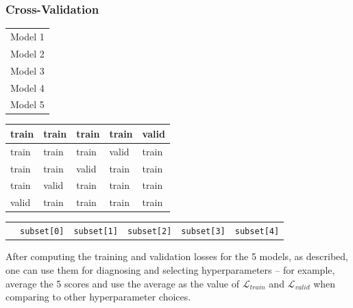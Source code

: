 \documentclass[smaller]{beamer}
\theoremstyle{example}
\newcommand{\ttt}[1]{{\small\texttt{#1}}}
\begin{document}
\begin{frame}[fragile]
    \frametitle{Cross-Validation}
    
\begin{center}
    \renewcommand{\arraystretch}{1.2}
    \begin{tabular}{l}
        {\footnotesize\color{blue}Model 1} \\ 
        {\footnotesize\color{blue}Model 2} \\
        {\footnotesize\color{blue}Model 3} \\
        {\footnotesize\color{blue}Model 4} \\
        {\footnotesize\color{blue}Model 5}
    \end{tabular}
    \renewcommand{\arraystretch}{1}
    \begin{tabular}{|p{}|p{}|p{}|p{}|p{}|}
        \hline 
        \quad train & \quad train & \quad train & \quad train & \quad valid \\ 
        \hline
        \hline
        \quad train & \quad train & \quad train & \quad valid & \quad train \\ 
        \hline
        \hline
        \quad train & \quad train & \quad valid & \quad train & \quad train \\ 
        \hline
        \hline
        \quad train & \quad valid & \quad train & \quad train & \quad train \\ 
        \hline
        \hline
        \quad valid & \quad train & \quad train & \quad train & \quad train \\
        \hline
    \end{tabular}
\end{center}
\vspace*{-10pt}
{\color{blue}
\begin{center}
    \begin{tabular}{p{}p{}|p{}|p{}|p{}|p{}}
        \phantom{i} & \ttt{subset[0]} & \ttt{subset[1]} & \ttt{subset[2]} & \ttt{subset[3]} & \ttt{subset[4]}
    \end{tabular}
\end{center}
}

After computing the training and validation losses for the 5 models, as described, one can use them for diagnosing and selecting hyperparameters {--} for example, average the 5 scores and use the average as the value of $\mathcal L_{train}$ and $\mathcal L_{valid}$ when comparing to other hyperparameter choices.

\end{frame}
\end{document}
